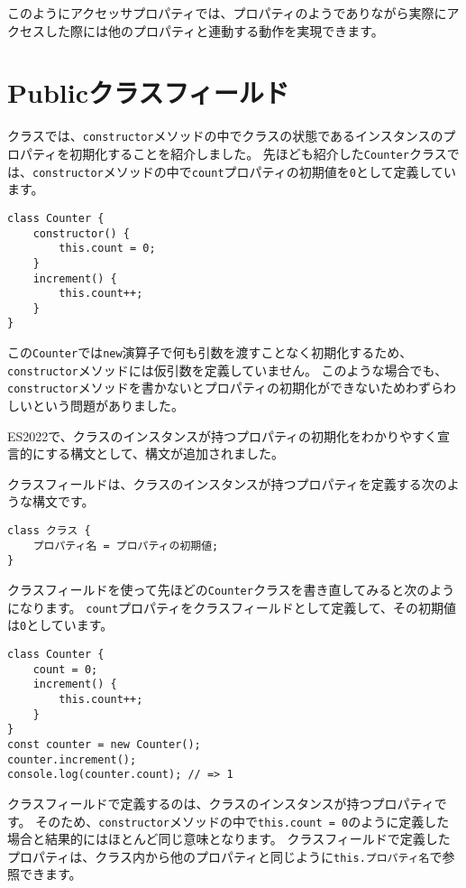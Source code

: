 このようにアクセッサプロパティでは、プロパティのようでありながら実際にアクセスした際には他のプロパティと連動する動作を実現できます。

\hypertarget{public-class-fields}{%
\section[Publicクラスフィールド]{Publicクラスフィールド\,\protect{}}\label{public-class-fields}}

クラスでは、\texttt{constructor}メソッドの中でクラスの状態であるインスタンスのプロパティを初期化することを紹介しました。
先ほども紹介した\texttt{Counter}クラスでは、\texttt{constructor}メソッドの中で\texttt{count}プロパティの初期値を\texttt{0}として定義しています。

\begin{lstlisting}
class Counter {
    constructor() {
        this.count = 0;
    }
    increment() {
        this.count++;
    }
}
\end{lstlisting}

この\texttt{Counter}では\texttt{new}演算子で何も引数を渡すことなく初期化するため、\texttt{constructor}メソッドには仮引数を定義していません。
このような場合でも、\texttt{constructor}メソッドを書かないとプロパティの初期化ができないためわずらわしいという問題がありました。

ES2022で、クラスのインスタンスが持つプロパティの初期化をわかりやすく宣言的にする構文として、\textbf{}構文が追加されました。

クラスフィールドは、クラスのインスタンスが持つプロパティを定義する次のような構文です。

\begin{lstlisting}
class クラス {
    プロパティ名 = プロパティの初期値;
}
\end{lstlisting}

クラスフィールドを使って先ほどの\texttt{Counter}クラスを書き直してみると次のようになります。
\texttt{count}プロパティをクラスフィールドとして定義して、その初期値は\texttt{0}としています。
\newpage
\begin{lstlisting}
class Counter {
    count = 0;
    increment() {
        this.count++;
    }
}
const counter = new Counter();
counter.increment();
console.log(counter.count); // => 1
\end{lstlisting}

クラスフィールドで定義するのは、クラスのインスタンスが持つプロパティです。
そのため、\texttt{constructor}メソッドの中で\texttt{this.count = 0}のように定義した場合と結果的にはほとんど同じ意味となります。
クラスフィールドで定義したプロパティは、クラス内から他のプロパティと同じように\texttt{this.プロパティ名}で参照できます。

